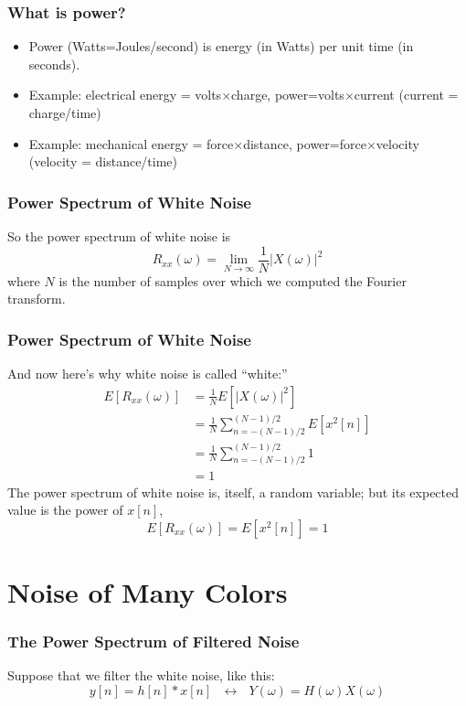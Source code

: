 \documentclass{beamer}
\begin{document}
\begin{frame}
  \frametitle{What is power?}

  \begin{itemize}
    \item Power (Watts=Joules/second) is energy (in Watts) per unit time (in seconds).
    \item Example: electrical energy = volts$\times$charge,
      power=volts$\times$current (current = charge/time)
    \item Example: mechanical energy = force$\times$distance,
      power=force$\times$velocity (velocity = distance/time)
  \end{itemize}
\end{frame}

\begin{frame}
  \frametitle{Power Spectrum of White Noise}

  So the power spectrum of white noise is
  \begin{displaymath}
    R_{xx}(\omega) = \lim_{N\rightarrow\infty} \frac{1}{N} |X(\omega)|^2
  \end{displaymath}
  where $N$ is the number of samples over which we computed the Fourier transform.
\end{frame}
\begin{frame}
  \frametitle{Power Spectrum of White Noise}
  And now here's why white noise is called ``white:''
  \begin{align*}
    E\left[R_{xx}(\omega)\right] &= \frac{1}{N}E\left[|X(\omega)|^2\right]\\
    &=  \frac{1}{N}\sum_{n=-(N-1)/2}^{(N-1)/2} E\left[x^2[n]\right]\\
    &=  \frac{1}{N}\sum_{n=-(N-1)/2}^{(N-1)/2} 1\\
    &= 1
  \end{align*}
  The power spectrum of white noise is, itself, a random variable; but
  its expected value is the power of $x[n]$,
  \begin{displaymath}
    E\left[R_{xx}(\omega)\right] = E[x^2[n]]=1
  \end{displaymath}
\end{frame}

\section[Colors]{Noise of Many Colors}
\setcounter{subsection}{1}

\begin{frame}
  \frametitle{The Power Spectrum of Filtered Noise}

  Suppose that we filter the white noise, like this:
  \begin{displaymath}
    y[n]=h[n]\ast x[n]~~~\leftrightarrow~~~Y(\omega) =H(\omega)X(\omega)
  \end{displaymath}
\end{frame}
\end{document}
